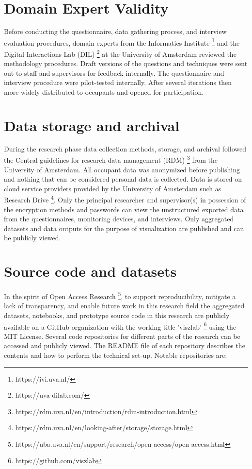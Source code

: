 \begin{appendices}
\section{Domain Expert Validity}
\label{appendix:experts}

Before conducting the questionnaire, data gathering process, and interview evaluation procedures, domain experts from the Informatics Institute \footnote{https://ivi.uva.nl/} and the Digital Interactions Lab (DIL) \footnote{https://uva-dilab.com/} at the University of Amsterdam reviewed the methodology procedures. Draft versions of the questions and techniques were sent out to staff and supervisors for feedback internally. The questionnaire and interview procedure were pilot-tested internally. After several iterations then more widely distributed to occupants and opened for participation. 

\section{Data storage and archival}
\label{appendix:data}

During the research phase data collection methods, storage, and archival followed the Central guidelines for research data management (RDM) \footnote{https://rdm.uva.nl/en/introduction/rdm-introduction.html} from the University of Amsterdam. All occupant data was anonymized before publishing and nothing that can be considered personal data is collected. Data is stored on cloud service providers provided by the University of Amsterdam such as Research Drive \footnote{https://rdm.uva.nl/en/looking-after/storage/storage.html}. Only the principal researcher and supervisor(s) in possession of the encryption methods and passwords can view the unstructured exported data from the questionnaires, monitoring devices, and interviews. Only aggregated datasets and data outputs for the purpose of visualization are published and can be publicly viewed.

\section{Source code and datasets}
\label{appendix:source}

In the spirit of Open Access Research \footnote{https://uba.uva.nl/en/support/research/open-access/open-access.html}, to support reproducibility, mitigate a lack of transparency, and enable future work in this research field the aggregated datasets, notebooks, and prototype source code in this research are publicly available on a GitHub organization with the working title 'viszlab' \footnote{https://github.com/viszlab} using the MIT License. Several code repositories for different parts of the research can be accessed and publicly viewed. The README file of each repository describes the contents and how to perform the technical set-up. Notable repositories are:


\end{appendices}
